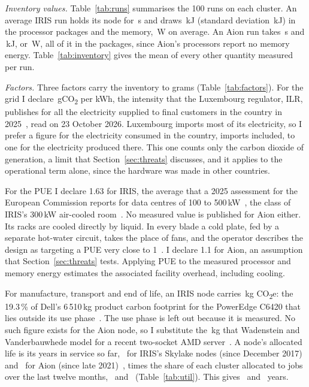 \documentclass[conference,a4paper]{IEEEtran}
\begin{document}
\emph{Inventory values.} Table~\ref{tab:runs} summarises the 100 runs on each
cluster. An
average IRIS run holds its node for \IrisTime\,s and draws \IrisEnergy\,kJ
(standard deviation \IrisEnergySd\,kJ) in the processor packages and the memory,
\IrisPower\,W on average. An Aion run takes \AionTime\,s and \AionEnergy\,kJ, or
\AionPower\,W, all of it in the packages, since Aion's processors report no
memory energy. Table~\ref{tab:inventory} gives the mean of every other quantity
measured per run.

\emph{Factors.} Three factors carry the inventory to grams
(Table~\ref{tab:factors}). For the grid I declare \Grid\,gCO\textsubscript{2}
per kWh, the intensity that the Luxembourg regulator, ILR, publishes for all the
electricity supplied to final customers in the country in 2025~\cite{ilr2026},
read on 23 October 2026. Luxembourg imports most of its electricity, so I prefer
a figure for the electricity consumed in the country, imports included, to one
for the electricity produced there. This one counts only the carbon dioxide of
generation, a limit that Section~\ref{sec:threats} discusses, and it applies to
the operational term alone, since the hardware was made in other countries.

For the PUE I declare 1.63 for IRIS, the average that a 2025 assessment for the
European Commission reports for data centres of 100 to 500\,kW~\cite{ec2025},
the class of IRIS's 300\,kW air-cooled room~\cite{ulhpc-dc}. No measured value
is published for Aion either. Its racks are cooled directly by liquid. In every
blade a cold plate, fed by a separate hot-water circuit, takes the place of fans,
and the operator describes the design as targeting a PUE very close to
1~\cite{ulhpc-aion,ulhpc-dc}. I declare 1.1 for Aion, an assumption that
Section~\ref{sec:threats} tests. Applying PUE to the measured processor and
memory energy estimates the associated facility overhead, including cooling.

For manufacture, transport and end of life, an IRIS node carries
\IrisEmbKg\,kg CO\textsubscript{2}e: the 19.3\,\% of Dell's 6\,510\,kg product
carbon footprint for the PowerEdge C6420 that lies outside its use
phase~\cite{dell-c6420-pcf}. The use phase is left out because it is measured. No
such figure exists for the Aion node, so I substitute the \AionEmbKg\,kg that
Wadenstein and Vanderbauwhede model for a recent two-socket AMD
server~\cite{wadenstein2025}. A node's allocated life is its years in service so
far, \IrisLife\ for IRIS's Skylake nodes (since December 2017) and \AionLife\ for
Aion (since late 2021)~\cite{ulhpc-iris,ulhpc-aion}, times the share of each
cluster allocated to jobs over the last twelve months, \IrisAlloc\ and
\AionAlloc\ (Table~\ref{tab:util}). This gives \IrisTalloc\ and \AionTalloc\
years.
\end{document}
